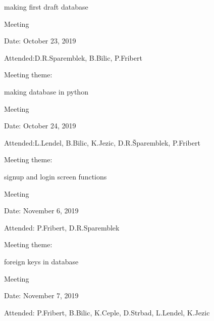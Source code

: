 \begin{packed_enum}
\begin{packed_item}
				\begin{packed_item}
					\item  making first draft database
				\end{packed_item}
			\end{packed_item}
			\item  Meeting
			\item[] \begin{packed_item}
				\item Date: October 23, 2019
				\item Attended:D.R.Sparemblek, B.Bilic, P.Fribert
				\item Meeting theme:
				\begin{packed_item}
					\item  making database in python
				\end{packed_item}
			\end{packed_item}
			\item  Meeting
			\item[] \begin{packed_item}
				\item Date: October 24, 2019
				\item Attended:L.Lendel, B.Bilic, K.Jezic, D.R.Šparemblek, P.Fribert
				\item Meeting theme:
				\begin{packed_item}
					\item  signup and login screen functions
				\end{packed_item}
			\end{packed_item}
			\item  Meeting
			\item[] \begin{packed_item}
				\item Date: November 6, 2019
				\item Attended: P.Fribert, D.R.Sparemblek
				\item Meeting theme:
				\begin{packed_item}
					\item  foreign keys in database
				\end{packed_item}
			\end{packed_item}
			\item  Meeting
			\item[] \begin{packed_item}
				\item Date: November 7, 2019
				\item Attended: P.Fribert, B.Bilic, K.Ceple, D.Strbad, L.Lendel, K.Jezic

\end{packed_item}
\end{packed_enum}

